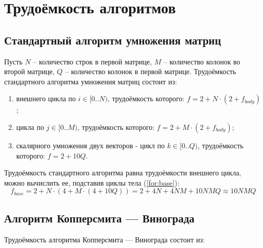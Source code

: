 \documentclass[12pt]{report}
\begin{document}
	\section{Трудоёмкость алгоритмов}
	
	\subsection{Стандартный алгоритм умножения матриц}
	
	Пусть $N$ -- количество строк в первой матрице, $M$ -- количество колонок во второй матрице, $Q$ -- количество колонок в первой матрице.
	Трудоёмкость стандартного алгоритма умножения матриц состоит из:
	
	\begin{enumerate}
		\item[1)] внешнего цикла по $i \in [0..N)$, трудоёмкость которого: $f = 2 + N \cdot (2 + f_{body})$;
		\item[2)] цикла по $j \in [0..M)$, трудоёмкость которого: $f = 2 + M \cdot (2 + f_{body})$;
		\item[3)] скалярного умножения двух векторов - цикл по $k \in [0..Q)$, трудоёмкость которого: $f = 2 + 10Q$.
	\end{enumerate}
	
	Трудоёмкость стандартного алгоритма равна трудоёмкости внешнего цикла, можно вычислить ее, подставив циклы тела (\ref{for:base}):
	\begin{equation}
		\label{for:base}
		f_{base} = 2 + N \cdot (4 + M \cdot (4 + 10Q)) = 2 + 4N + 4NM + 10NMQ \approx 10NMQ
	\end{equation}
	
	\subsection{Алгоритм Копперсмита — Винограда}

	Трудоёмкость алгоритма Копперсмита — Винограда состоит из:
\end{document}

